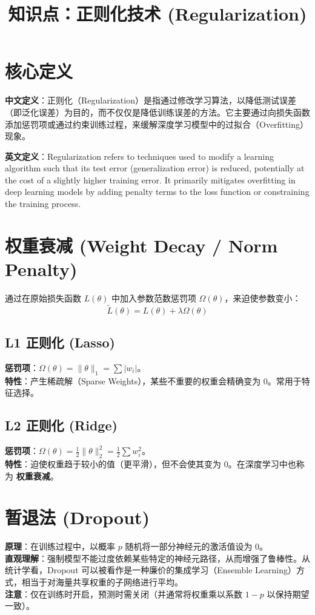 \documentclass[12pt, a4paper]{article}
\title{知识点：正则化技术 (Regularization)}
\author{}
\date{}
\begin{document}
\maketitle

\section{核心定义}
\textbf{中文定义}：正则化（Regularization）是指通过修改学习算法，以降低测试误差（即泛化误差）为目的，而不仅仅是降低训练误差的方法。它主要通过向损失函数添加惩罚项或通过约束训练过程，来缓解深度学习模型中的过拟合（Overfitting）现象。

\textbf{英文定义}：Regularization refers to techniques used to modify a learning algorithm such that its test error (generalization error) is reduced, potentially at the cost of a slightly higher training error. It primarily mitigates overfitting in deep learning models by adding penalty terms to the loss function or constraining the training process.

\section{权重衰减 (Weight Decay / Norm Penalty)}
通过在原始损失函数 $L(\theta)$ 中加入参数范数惩罚项 $\Omega(\theta)$，来迫使参数变小：
$$ \tilde{L}(\theta) = L(\theta) + \lambda \Omega(\theta) $$

\subsection{L1 正则化 (Lasso)}
\textbf{惩罚项}：$\Omega(\theta) = \|\theta\|_1 = \sum |w_i|$。
\\ \textbf{特性}：产生稀疏解（Sparse Weights），某些不重要的权重会精确变为 0。常用于特征选择。

\subsection{L2 正则化 (Ridge)}
\textbf{惩罚项}：$\Omega(\theta) = \frac{1}{2} \|\theta\|_2^2 = \frac{1}{2} \sum w_i^2$。
\\ \textbf{特性}：迫使权重趋于较小的值（更平滑），但不会使其变为 0。在深度学习中也称为 \textbf{权重衰减}。

\section{暂退法 (Dropout)}
\textbf{原理}：在训练过程中，以概率 $p$ 随机将一部分神经元的激活值设为 0。
\\ \textbf{直观理解}：强制模型不能过度依赖某些特定的神经元路径，从而增强了鲁棒性。从统计学看，Dropout 可以被看作是一种廉价的集成学习（Ensemble Learning）方式，相当于对海量共享权重的子网络进行平均。
\\ \textbf{注意}：仅在训练时开启，预测时需关闭（并通常将权重乘以系数 $1-p$ 以保持期望一致）。
\end{document}
